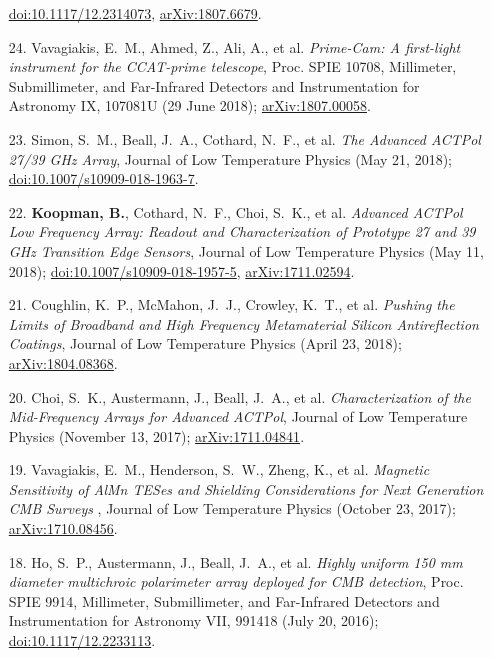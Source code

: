 \documentclass[margin,line]{res}
\begin{document}
\begin{resume}
\begin{enumerate}
    \href{https://doi.org/10.1117/12.2314073}{doi:10.1117/12.2314073},
    \href{https://arxiv.org/abs/1807.06678}{arXiv:1807.6679}.
\item[{24.}] Vavagiakis, E.~M., Ahmed, Z., Ali, A., et al.
    \textit{Prime-Cam: A first-light instrument for the CCAT-prime telescope},
    Proc. SPIE 10708, Millimeter, Submillimeter, and Far-Infrared Detectors and
    Instrumentation for Astronomy IX, 107081U (29 June 2018);
    \href{https://arxiv.org/abs/1807.00058}{arXiv:1807.00058}.
\item[{23.}] Simon, S.~M., Beall, J.~A., Cothard, N.~F., et al.
    \textit{The Advanced ACTPol 27/39 GHz Array},
    Journal of Low Temperature Physics (May 21, 2018);
    \href{https://doi.org/10.1007/s10909-018-1963-7}{doi:10.1007/s10909-018-1963-7}.
\item[{22.}] \textbf{Koopman, B.}, Cothard, N.~F., Choi, S.~K., et al.
    \textit{Advanced ACTPol Low Frequency Array: Readout and Characterization
    of Prototype 27 and 39 GHz Transition Edge Sensors}, Journal of Low Temperature
    Physics (May 11, 2018);
    \href{https://doi.org/10.1007/s10909-018-1957-5}{doi:10.1007/s10909-018-1957-5}, 
    \href{https://arxiv.org/abs/1711.02594}{arXiv:1711.02594}.
\item[{21.}] Coughlin, K.~P., McMahon, J.~J., Crowley, K.~T., et al.
    \textit{Pushing the Limits of Broadband and High Frequency Metamaterial
    Silicon Antireflection Coatings}, Journal of Low Temperature Physics
    (April 23, 2018); \href{https://arxiv.org/abs/1804.08368}{arXiv:1804.08368}.
\item[{20.}] Choi, S.~K., Austermann, J., Beall, J.~A., et al.
    \textit{Characterization of the Mid-Frequency Arrays for Advanced ACTPol},
    Journal of Low Temperature Physics (November 13, 2017);
    \href{https://arxiv.org/abs/1711.04841}{arXiv:1711.04841}.
\item[{19.}] Vavagiakis, E.~M., Henderson, S.~W., Zheng, K., et al.
    \textit{Magnetic Sensitivity of AlMn TESes and Shielding Considerations for
Next Generation CMB Surveys }, Journal of Low Temperature
    Physics (October 23, 2017);
    \href{https://arxiv.org/abs/1710.08456}{arXiv:1710.08456}.
\item[{18.}] Ho, S.~P., Austermann, J., Beall, J.~A., et al.
    \textit{Highly uniform 150 mm diameter multichroic polarimeter array
    deployed for CMB detection}, Proc. SPIE 9914,
    Millimeter, Submillimeter, and Far-Infrared Detectors and Instrumentation for
    Astronomy VII, 991418 (July 20, 2016);
    \href{http://dx.doi.org/10.1117/12.2233113}{doi:10.1117/12.2233113}.

\end{enumerate}
\end{resume}
\end{document}

